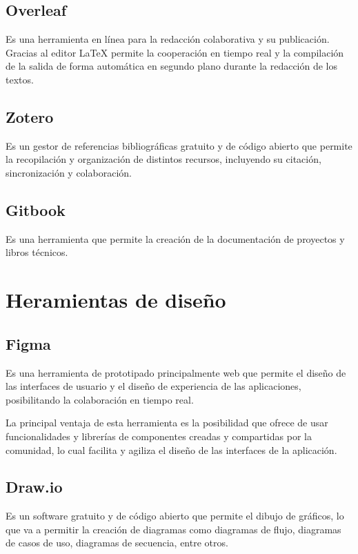 \subsection{Overleaf}
\cite{Overleaf_bib} Es una herramienta en línea para la redacción colaborativa y su publicación. Gracias al editor LaTeX permite la cooperación en tiempo real y la compilación de la salida de forma automática en segundo plano durante la redacción de los textos.

\subsection{Zotero}
\cite{Zotero_bib} Es un gestor de referencias bibliográficas gratuito y de código abierto que permite la recopilación y organización de distintos recursos, incluyendo su citación, sincronización y colaboración. 

\newpage
\subsection{Gitbook}
\cite{gitbook} Es una herramienta que permite la creación de la documentación de proyectos y libros técnicos.

\section{Heramientas de diseño}
\subsection{Figma}
\cite{Figma1_bib} Es una herramienta de prototipado principalmente web que permite el diseño de las interfaces de usuario y el diseño de experiencia de las aplicaciones, posibilitando la colaboración en tiempo real.

\cite{Figma2_bib} La principal ventaja de esta herramienta es la posibilidad que ofrece de usar funcionalidades y librerías de componentes creadas y compartidas por la comunidad, lo cual facilita y agiliza el diseño de las interfaces de la aplicación.

\subsection{Draw.io}
\cite{drawio_bib} Es un software gratuito y de código abierto que permite el dibujo de gráficos, lo que va a permitir la creación de diagramas como diagramas de flujo, diagramas de casos de uso, diagramas de secuencia, entre otros.
\newpage

